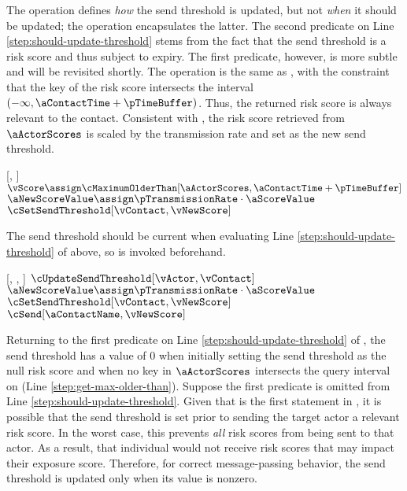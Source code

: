 The \cSetSendThreshold operation defines \emph{how} the send threshold is updated, but not \emph{when} it should be updated; the \cUpdateSendThreshold operation encapsulates the latter. The second predicate on Line \ref{step:should-update-threshold} stems from the fact that the send threshold is a risk score and thus subject to expiry. The first predicate, however, is more subtle and will be revisited shortly. The \cMaximumOlderThan operation is the same as \cMaximum, with the constraint that the key of the risk score intersects the interval $(-\infty, \aContactTime + \pTimeBuffer)$. Thus, the returned risk score is always relevant to the contact. Consistent with \cApplyRiskScore, the risk score retrieved from $\aActorScores$ is scaled by the transmission rate and set as the new send threshold.

\begin{function}{\nUpdateSendThreshold}[\vActor, \vContact]
   \label{step:should-update-threshold}
    \State $\vScore \assign \cMaximumOlderThan[\aActorScores, \aContactTime + \pTimeBuffer]$ \label{step:get-max-older-than}
    \State $\aNewScoreValue \assign \pTransmissionRate \cdot \aScoreValue$
    \State $\cSetSendThreshold[\vContact, \vNewScore]$
  \EndIf
\end{function}

The send threshold should be current when evaluating Line \ref{step:should-update-threshold} of \cApplyRiskScore above, so \cUpdateSendThreshold is invoked beforehand.

\begin{function}{\nApplyRiskScore}[\vActor, \vContact, \vScore]
  \State $\cUpdateSendThreshold[\vActor, \vContact]$
  \If{$\aContactThresholdValue < \aScoreValue \AND \aContactTime + \pTimeBuffer > \aScoreTime$}
    \State $\aNewScoreValue \assign \pTransmissionRate \cdot \aScoreValue$
    \State $\cSetSendThreshold[\vContact, \vNewScore]$
    \State $\cSend[\aContactName, \vNewScore]$
  \EndIf
\end{function}

Returning to the first predicate on Line \ref{step:should-update-threshold} of \cUpdateSendThreshold, the send threshold has a value of 0 when initially setting the send threshold as the null risk score and when no key in $\aActorScores$ intersects the query interval on (Line \ref{step:get-max-older-than}). Suppose the first predicate is omitted from Line \ref{step:should-update-threshold}. Given that \cUpdateSendThreshold is the first statement in \cApplyRiskScore, it is possible that the send threshold is set prior to sending the target actor a relevant risk score. In the worst case, this prevents \emph{all} risk scores from being sent to that actor. As a result, that individual would not receive risk scores that may impact their exposure score. Therefore, for correct message-passing behavior, the send threshold is updated only when its value is nonzero.

